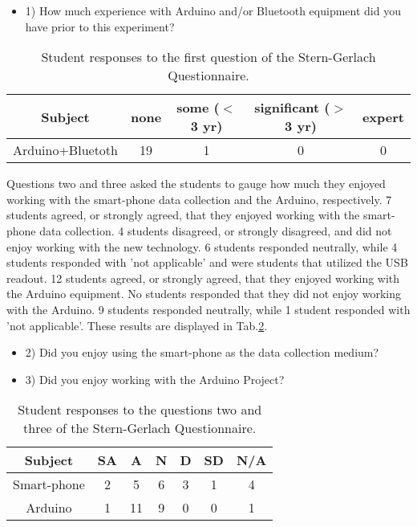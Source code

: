 \begin{table}[htpb]
  \scriptsize
  \begin{center}
    \caption{\scriptsize Student responses to the first question of the Stern-Gerlach Questionnaire.}
    \label{tab:t14q1}
    \begin{itemize}
    \item 1) How much experience with Arduino and/or Bluetooth equipment did you have prior to this experiment?
    \end{itemize}
    

    \begin{tabular}{|c | c | c | c | c |}
      \hline
      Subject & none & some ($<$ 3 yr) & significant  ($>$ 3 yr) & expert\\
      \hline
      Arduino+Bluetoth & 19 & 1 & 0 & 0\\
      \hline
    \end{tabular}
  \end{center}%
\end{table}

Questions two and three asked the students to gauge how much they enjoyed working with the smart-phone data collection and the Arduino, respectively.
7 students agreed, or strongly agreed, that they enjoyed working with the smart-phone data collection.
4 students disagreed, or strongly disagreed, and did not enjoy working with the new technology.
6 students responded neutrally, while 4 students responded with 'not applicable' and were students that utilized the USB readout.
12 students agreed, or strongly agreed, that they enjoyed working with the Arduino equipment.
No students responded that they did not enjoy working with the Arduino.
9 students responded neutrally, while 1 student responded with 'not applicable'.
These results are displayed in Tab.\ref{tab:t14q23}.

\begin{table}[htpb]
  \scriptsize
  \begin{center}
    \caption{\scriptsize Student responses to the questions two and three of the Stern-Gerlach Questionnaire.}
    \label{tab:t14q23}
    \begin{itemize}
    \item 2) Did you enjoy using the smart-phone as the data collection medium?
    \item 3) Did you enjoy working with the Arduino Project?
    \end{itemize}
    

    \begin{tabular}{|c | c | c | c | c | c | c|}
      \hline
      Subject & SA & A & N & D & SD & N/A\\
      \hline
      Smart-phone & 2 & 5 & 6 & 3 & 1 & 4\\
      \hline
      Arduino & 1 & 11 & 9 & 0 & 0 & 1\\
      \hline
    \end{tabular}
  \end{center}%
\end{table}

